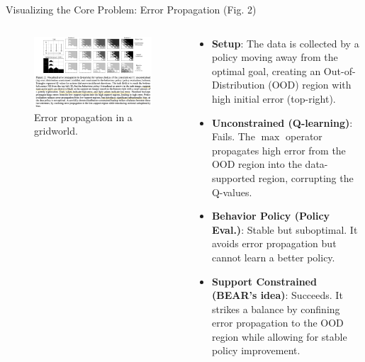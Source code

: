 \documentclass[11pt]{beamer}
\newcommand{\tb}[1]{\textbf{#1}}
\begin{document}
\begin{frame}{Visualizing the Core Problem: Error Propagation (Fig. 2)}
    \begin{columns}[T] %
        
        \begin{column}{0.5\textwidth}
            \begin{figure}
                \centering
                \includegraphics[width=\textwidth]{Figure2.png}
                \caption{Error propagation in a gridworld.}
            \end{figure}
        \end{column}
        
        \begin{column}{0.5\textwidth}
            \begin{itemize}
                \item \tb{Setup}: The data is collected by a policy moving away from the optimal goal, creating an Out-of-Distribution (OOD) region with high initial error (top-right).
                \vspace{1em}
                \item \tb{Unconstrained (Q-learning)}: Fails. The $\max$ operator propagates high error from the OOD region into the data-supported region, corrupting the Q-values.
                \vspace{1em}
                \item \tb{Behavior Policy (Policy Eval.)}: Stable but suboptimal. It avoids error propagation but cannot learn a better policy.
                \vspace{1em}
                \item \tb{Support Constrained (BEAR's idea)}: Succeeds. It strikes a balance by confining error propagation to the OOD region while allowing for stable policy improvement.
            \end{itemize}
        \end{column}
        
    \end{columns}
\end{frame}
\end{document}
